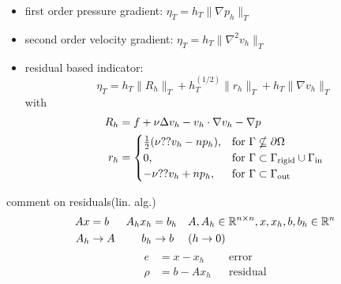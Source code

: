 \begin{example}
\begin{itemize}
		\item first order pressure gradient:  $\eta_T = h_T \|\nabla p_h\|_T$
		\item second order velocity gradient:  $\eta_T = h_T \|\nabla^2 v_h\|_T$
		\item residual based indicator: 
		\begin{equation*}
			\eta_T = h_T \|R_h\|_T +  h_T^{(1/2)} \|r_h\|_T + h_T \|\nabla v_h\|_T
		\end{equation*}
		with 
		\begin{align*}
			R_h &= f + \nu \Delta v_h - v_h \cdot \nabla v_h -  \nabla p \\
			r_h &= 
			\begin{cases}
				\frac{1}{2}(\nu ?? v_h - n p_h), &\text{for }\Gamma \nsubseteq \partial \Omega\\
				0 ,&\text{for }\Gamma \subset \Gamma_{\text{rigid}}\cup\Gamma_{\text{in}}\\
				-\nu ?? v_h + n p_h, &\text{for }\Gamma \subset \Gamma_{\text{out}}
			\end{cases} 
		\end{align*}
	\end{itemize}
	comment on residuals(lin. alg.)
	\begin{align*}
		Ax&=b &  A_h x_h &= b_h &&A,A_h \in \mathbb{R}^{n\times n},x,x_h,b,b_h\in\mathbb{R}^n \\
		A_h&\to A & b_h &\to b  &&(h\to 0)\\
	\end{align*}
	\begin{align*}
		e&= x-x_h &&\text{error}\\
		\rho&= b-Ax_h&&\text{residual}
	\end{align*}
\end{example}

